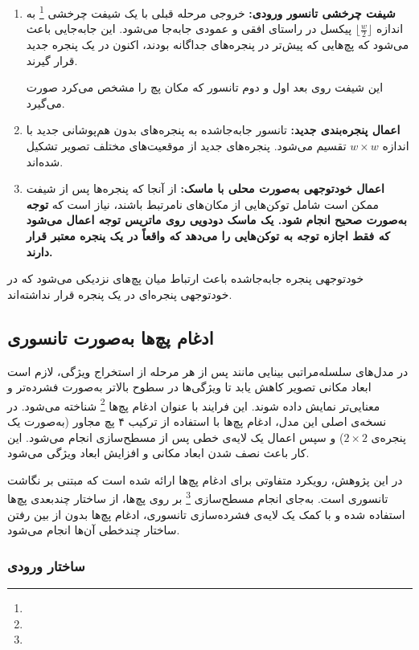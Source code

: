 \begin{enumerate}
	\item \textbf{شیفت چرخشی تانسور ورودی:} خروجی مرحله قبلی با یک شیفت چرخشی \footnote{} به اندازه $\lfloor \frac{w}{2} \rfloor$ پیکسل در راستای افقی و عمودی جابه‌جا می‌شود. این جابه‌جایی باعث می‌شود که پچ‌هایی که پیش‌تر در پنجره‌های جداگانه بودند، اکنون در یک پنجره جدید قرار گیرند.
	
	این شیفت روی بعد اول و دوم تانسور که مکان پچ را مشخص می‌کرد صورت می‌گیرد.
	
	\item \textbf{اعمال پنجره‌بندی جدید:} تانسور جابه‌جاشده به پنجره‌های بدون هم‌پوشانی جدید با اندازه $w \times w$ تقسیم می‌شود. پنجره‌های جدید از موقعیت‌های مختلف تصویر تشکیل شده‌اند.
	
	\item \textbf{اعمال خودتوجهی به‌صورت محلی با ماسک:} از آنجا که پنجره‌ها پس از شیفت ممکن است شامل توکن‌هایی از مکان‌های نامرتبط باشند، نیاز است که \textbf{توجه به‌صورت صحیح انجام شود. یک ماسک دودویی روی ماتریس توجه اعمال می‌شود که فقط اجازه توجه به توکن‌هایی را می‌دهد که واقعاً در یک پنجره معتبر قرار دارند.}
	
\end{enumerate}

خودتوجهی پنجره جابه‌جاشده باعث ارتباط میان پچ‌های نزدیکی می‌شود که در خودتوجهی پنجره‌ای در یک پنجره قرار نداشته‌اند.

\subsection{ادغام پچ‌ها به‌صورت تانسوری}

در مدل‌های سلسله‌مراتبی بینایی مانند پس از هر مرحله از استخراج ویژگی، لازم است ابعاد مکانی تصویر کاهش یابد تا ویژگی‌ها در سطوح بالاتر به‌صورت فشرده‌تر و معنایی‌تر نمایش داده شوند. این فرایند با عنوان ادغام پچ‌ها \footnote{} شناخته می‌شود. در نسخه‌ی اصلی این مدل، ادغام پچ‌ها با استفاده از ترکیب ۴ پچ مجاور (به‌صورت یک پنجره‌ی $2 \times 2$) و سپس اعمال یک لایه‌ی خطی پس از مسطح‌سازی انجام می‌شود. این کار باعث نصف شدن ابعاد مکانی و افزایش ابعاد ویژگی می‌شود.

در این پژوهش، رویکرد متفاوتی برای ادغام پچ‌ها ارائه شده است که مبتنی بر نگاشت تانسوری است. به‌جای انجام مسطح‌سازی \footnote{} بر روی پچ‌ها، از ساختار چندبعدی پچ‌ها استفاده شده و با کمک یک لایه‌ی فشرده‌سازی تانسوری، ادغام پچ‌ها بدون از بین رفتن ساختار چندخطی آن‌ها انجام می‌شود.

\subsubsection*{ساختار ورودی}

